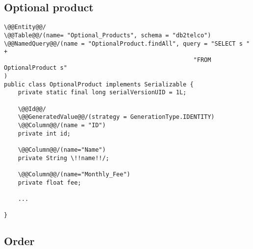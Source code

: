 \subsection*{Optional product}

\begin{lstlisting}[style = JPA]
\@@Entity@@/
\@@Table@@/(name= "Optional_Products", schema = "db2telco")
\@@NamedQuery@@/(name = "OptionalProduct.findAll", query = "SELECT s " + 
                                                      "FROM OptionalProduct s"
)
public class OptionalProduct implements Serializable {
    private static final long serialVersionUID = 1L;

    \@@Id@@/
    \@@GeneratedValue@@/(strategy = GenerationType.IDENTITY)
    \@@Column@@/(name = "ID")
    private int id;

    \@@Column@@/(name="Name")
    private String \!!name!!/;

    \@@Column@@/(name="Monthly_Fee")
    private float fee;
    
    ...

}
\end{lstlisting}

\subsection*{Order}

